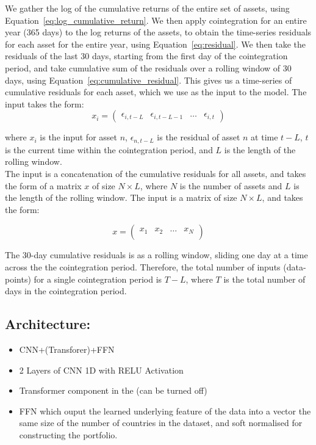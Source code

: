 \documentclass[12pt]{article}
\begin{document}
We gather the log of the cumulative returns of the entire set of assets, using Equation~\ref{eq:log_cumulative_return}. We then apply cointegration for an entire year (365 days) to the log returns of the assets, to obtain the time-series residuals for each asset for the entire year, using Equation~\ref{eq:residual}. We then take the residuals of the last 30 days, starting from the first day of the cointegration period, and take cumulative sum of the residuals over a rolling window of 30 days, using Equation~\ref{eq:cumulative_residual}. This gives us a time-series of cumulative residuals for each asset, which we use as the input to the model. The input takes the form:
\begin{equation}
    x_i = \begin{pmatrix}
        \epsilon_{i,t-L} & \epsilon_{i,t-L-1} & \ldots & \epsilon_{i,t}
    \end{pmatrix}
    \label{eq:input_single_asset}
\end{equation}

where $x_i$ is the input for asset $n$, $\epsilon_{n,t-L}$ is the residual of asset $n$ at time $t-L$, $t$ is the current time within the cointegration period, and $L$ is the length of the rolling window. 
\\
The input is a concatenation of the cumulative residuals for all assets, and takes the form of a matrix $x$ of size $N \times L$, where $N$ is the number of assets and $L$ is the length of the rolling window. The input is a matrix of size $N \times L$, and takes the form:

\begin{equation}
    x = \begin{pmatrix}
        x_1 & x_2 & \ldots & x_N \\
    \end{pmatrix}
    \label{eq:input_matrix}
\end{equation}

The 30-day cumulative residuals is as a rolling window, sliding one day at a time across the the cointegration period. Therefore, the total number of inputs (data-points) for a single cointegration period is $T - L$, where $T$ is the total number of days in the cointegration period.





\subsection*{Architecture:}
\begin{itemize}
    \item CNN+(Transforer)+FFN
    \item 2 Layers of CNN 1D with RELU Activation
    \item Transformer component in the  (can be turned off)
    \item FFN which ouput the learned underlying feature of the data into a vector the same size of the number of countries in the dataset, and soft normalised for constructing the portfolio.
\end{itemize}
\end{document}
